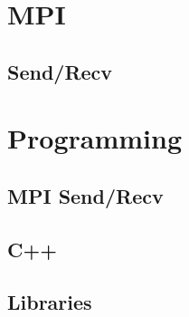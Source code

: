 \section{MPI}
\label{sec:mpi}

\subsection{Send/Recv}
\label{sec:sendrecv}

\begin{frame}{}
  
\end{frame}

\section{Programming}
\label{sec:programming}

\subsection{MPI Send/Recv}
\label{sec:mpi-sendrecv}

\begin{frame}{}
  
\end{frame}

\subsection{C++}
\label{sec:c++}

\begin{frame}{}
  
\end{frame}

\subsection{Libraries}
\label{sec:libraries}

\begin{frame}{}
  
\end{frame}







